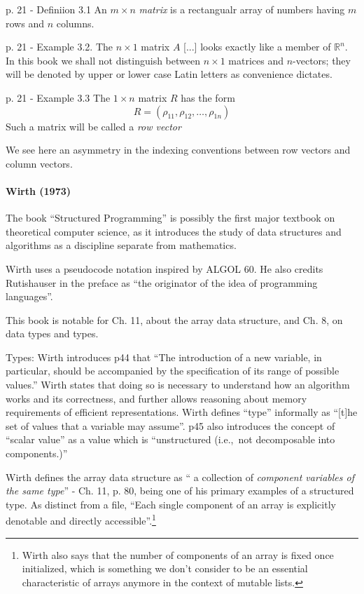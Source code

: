 p. 21 - Definiion 3.1 An $m\times n$ \textit{matrix} is a rectangualr array of numbers
having $m$ rows and $n$ columns.

p. 21 - Example 3.2. The $n\times1$ matrix $A$ [...] looks exactly like a member of $\mathbb R^n$. In this book
we shall not distinguish between $n\times1$ matrices and $n$-vectors; they will be denoted by
upper or lower case Latin letters as convenience dictates.

p. 21 - Example 3.3 The $1\times n$ matrix $R$ has the form
\[
    R = (\rho_{11},\rho_{12},\dots,\rho_{1n})
\]
Such a matrix will be called a \textit{row vector}

We see here an asymmetry in the indexing conventions between row vectors and
column vectors.

\paragraph{Wirth (1973)~\cite{Wirth1973}}

The book ``Structured Programming'' is possibly the first major textbook on theoretical computer science, as it introduces the study of data structures and algorithms as a discipline separate from mathematics.

Wirth uses a pseudocode notation inspired by ALGOL 60. He also credits Rutishauser
in the preface as ``the originator of the idea of programming languages''.

This book is notable for Ch. 11, about the array data structure, and Ch. 8, on data types and types.

Types: Wirth introduces p44 that ``The introduction of a new variable, in particular,
should be accompanied by the specification of
its range of possible values.'' Wirth states that doing so is necessary to understand
how an algorithm works and its correctness, and further allows reasoning about memory requirements
of efficient representations.
Wirth defines ``type'' informally as ``[t]he set of values that a variable may
assume''. p45 also introduces the concept of ``scalar value'' as a value
which is ``unstructured (i.e.,\ not decomposable into components.)''


Wirth defines the array data structure as `` a collection of \textit{component
variables of the same type}'' - Ch. 11, p. 80, being one of his primary
examples of a structured type. As distinct from a file, ``Each single component
of an array is explicitly denotable and directly accessible''.\footnote{Wirth
also says that the number of
components of an array is fixed once initialized, which is something we don't
consider to be an essential characteristic of arrays anymore in the context of
mutable lists.}

